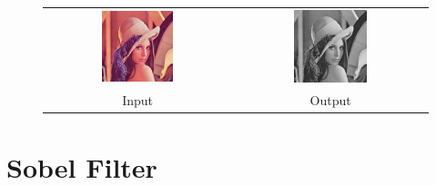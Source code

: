 \documentclass{beamer}
\begin{document}
\begin{frame}

\end{frame}

\begin{frame}

\end{frame}

\begin{frame}

\end{frame}

\begin{frame}
\begin{figure}\centering
\begin{tabular}{cc}
\includegraphics[width=0.4\textwidth]{examples/reduce/lena} &
\includegraphics[width=0.4\textwidth]{examples/reduce/output_example2} \\
Input & Output
\end{tabular}
\end{figure}
\end{frame}


\section{Sobel Filter} %
\end{document}

